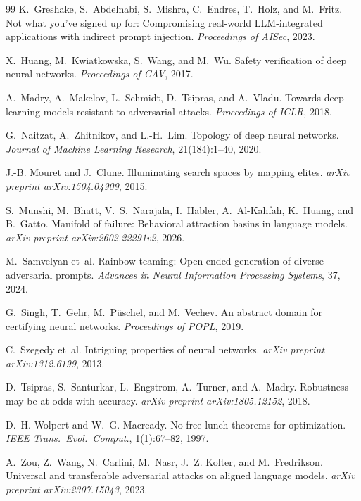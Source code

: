 \documentclass[11pt]{article}
\begin{document}
\begin{thebibliography}{99}
K.~Greshake, S.~Abdelnabi, S.~Mishra, C.~Endres, T.~Holz, and M.~Fritz.
\newblock Not what you've signed up for: Compromising real-world
  {LLM}-integrated applications with indirect prompt injection.
\newblock \emph{Proceedings of AISec}, 2023.

X.~Huang, M.~Kwiatkowska, S.~Wang, and M.~Wu.
\newblock Safety verification of deep neural networks.
\newblock \emph{Proceedings of CAV}, 2017.

A.~Madry, A.~Makelov, L.~Schmidt, D.~Tsipras, and A.~Vladu.
\newblock Towards deep learning models resistant to adversarial attacks.
\newblock \emph{Proceedings of ICLR}, 2018.

G.~Naitzat, A.~Zhitnikov, and L.-H.~Lim.
\newblock Topology of deep neural networks.
\newblock \emph{Journal of Machine Learning Research}, 21(184):1--40, 2020.

J.-B. Mouret and J.~Clune.
\newblock Illuminating search spaces by mapping elites.
\newblock \emph{arXiv preprint arXiv:1504.04909}, 2015.

S.~Munshi, M.~Bhatt, V.~S.~Narajala, I.~Habler, A.~Al-Kahfah,
K.~Huang, and B.~Gatto.
\newblock Manifold of failure: Behavioral attraction basins in language
  models.
\newblock \emph{arXiv preprint arXiv:2602.22291v2}, 2026.

M.~Samvelyan et~al.
\newblock Rainbow teaming: Open-ended generation of diverse adversarial
  prompts.
\newblock \emph{Advances in Neural Information Processing Systems}, 37,
2024.

G.~Singh, T.~Gehr, M.~P{\"u}schel, and M.~Vechev.
\newblock An abstract domain for certifying neural networks.
\newblock \emph{Proceedings of POPL}, 2019.

C.~Szegedy et~al.
\newblock Intriguing properties of neural networks.
\newblock \emph{arXiv preprint arXiv:1312.6199}, 2013.

D.~Tsipras, S.~Santurkar, L.~Engstrom, A.~Turner, and A.~Madry.
\newblock Robustness may be at odds with accuracy.
\newblock \emph{arXiv preprint arXiv:1805.12152}, 2018.

D.~H. Wolpert and W.~G. Macready.
\newblock No free lunch theorems for optimization.
\newblock \emph{IEEE Trans.\ Evol.\ Comput.}, 1(1):67--82, 1997.

A.~Zou, Z.~Wang, N.~Carlini, M.~Nasr, J.~Z. Kolter, and
M.~Fredrikson.
\newblock Universal and transferable adversarial attacks on aligned
  language models.
\newblock \emph{arXiv preprint arXiv:2307.15043}, 2023.
\end{thebibliography}
\end{document}
